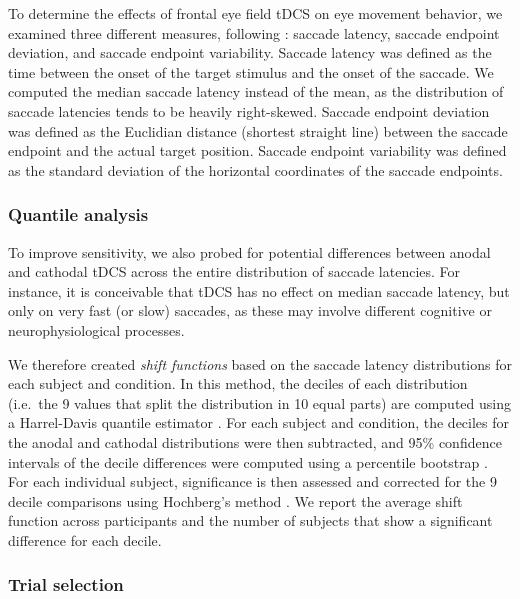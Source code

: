 \documentclass[11pt,]{memoir}
\begin{document}
To determine the effects of frontal eye field tDCS on eye movement behavior, we examined three different measures, following \textcite{Kanai2012}: saccade latency, saccade endpoint deviation, and saccade endpoint variability. Saccade latency was defined as the time between the onset of the target stimulus and the onset of the saccade. We computed the median saccade latency instead of the mean, as the distribution of saccade latencies tends to be heavily right-skewed. Saccade endpoint deviation was defined as the Euclidian distance (shortest straight line) between the saccade endpoint and the actual target position. Saccade endpoint variability was defined as the standard deviation of the horizontal coordinates of the saccade endpoints.

\hypertarget{quantile-analysis}{%
\subsubsection{Quantile analysis}\label{quantile-analysis}}

To improve sensitivity, we also probed for potential differences between anodal and cathodal tDCS across the entire distribution of saccade latencies. For instance, it is conceivable that tDCS has no effect on median saccade latency, but only on very fast (or slow) saccades, as these may involve different cognitive or neurophysiological processes.

We therefore created \emph{shift functions} \autocite{R-rogme} based on the saccade latency distributions for each subject and condition. In this method, the deciles of each distribution (i.e.~the 9 values that split the distribution in 10 equal parts) are computed using a Harrel-Davis quantile estimator \autocite{Harrel1982}. For each subject and condition, the deciles for the anodal and cathodal distributions were then subtracted, and 95\% confidence intervals of the decile differences were computed using a percentile bootstrap \autocite{Wilcox2012}. For each individual subject, significance is then assessed and corrected for the 9 decile comparisons using Hochberg's method \autocite{Hochberg1988}. We report the average shift function across participants and the number of subjects that show a significant difference for each decile.

\hypertarget{trial-selection}{%
\subsubsection{Trial selection}\label{trial-selection}}
\end{document}
